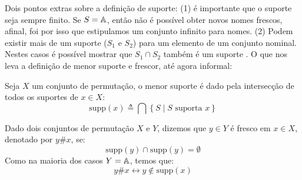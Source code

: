 Dois pontos extras sobre a definição de suporte: (1) é importante que o suporte seja sempre finito. Se $S = \mathbb{A}$, então não é possível obter novos nomes frescos, afinal, foi por isso que estipulamos um conjunto infinito para nomes.
(2) Podem existir mais de um suporte ($S_1$ e $S_2$) para um elemento de um conjunto nominal. Nestes casos é possível mostrar que $S_1 \cap S_2$ também é um suporte \cite[Proposição 2.3]{Pitts2013}. O que nos leva a definição de menor suporte e frescor, até agora informal:
\begin{definicao}
	Seja $X$ um conjunto de permutação, o menor suporte é dado pela intersecção de todos os suportes de $x \in X$:
	\begin{equation}\label{eq:menor-suporte}
		\text{supp}(x) \triangleq \bigcap \left\{ S \mid S \text{ suporta } x \right\}
	\end{equation}	
\end{definicao}
\begin{definicao}[Frescor]
	Dado dois conjuntos de permutação $X$ e $Y$, dizemos que $y \in Y$ é fresco em $x \in X$, denotado por $y \# x$, se:
	\begin{equation}\label{eq:frescor-supp}
		\text{supp}(y) \cap \text{supp}(y) = \emptyset
	\end{equation}
	Como na maioria dos casos $Y = \mathbb{A}$, temos que:
	\begin{equation}\label{eq:frescor}
		y \# x \leftrightarrow y \notin \text{supp}(x)
	\end{equation}
\end{definicao}

